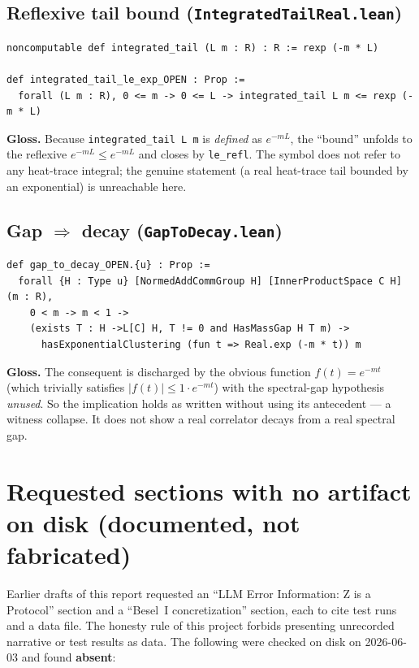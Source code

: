 \documentclass[11pt]{article}
\begin{document}
\subsection{Reflexive tail bound (\texttt{IntegratedTailReal.lean})}
\begin{Verbatim}[fontsize=\small,frame=single]
noncomputable def integrated_tail (L m : R) : R := rexp (-m * L)

def integrated_tail_le_exp_OPEN : Prop :=
  forall (L m : R), 0 <= m -> 0 <= L -> integrated_tail L m <= rexp (-m * L)
\end{Verbatim}
\textbf{Gloss.} Because \texttt{integrated\_tail L m} is \emph{defined} as
$e^{-mL}$, the ``bound'' unfolds to the reflexive $e^{-mL}\le e^{-mL}$ and
closes by \texttt{le\_refl}. The symbol does not refer to any heat-trace
integral; the genuine statement (a real heat-trace tail bounded by an
exponential) is unreachable here.

\subsection{Gap $\Rightarrow$ decay (\texttt{GapToDecay.lean})}
\begin{Verbatim}[fontsize=\small,frame=single]
def gap_to_decay_OPEN.{u} : Prop :=
  forall {H : Type u} [NormedAddCommGroup H] [InnerProductSpace C H] (m : R),
    0 < m -> m < 1 ->
    (exists T : H ->L[C] H, T != 0 and HasMassGap H T m) ->
      hasExponentialClustering (fun t => Real.exp (-m * t)) m
\end{Verbatim}
\textbf{Gloss.} The consequent is discharged by the obvious function
$f(t)=e^{-mt}$ (which trivially satisfies $|f(t)|\le 1\cdot e^{-mt}$) with the
spectral-gap hypothesis \emph{unused}. So the implication holds as written
without using its antecedent --- a witness collapse. It does not show a real
correlator decays from a real spectral gap.
\clearpage
\section{Requested sections with no artifact on disk (documented, not fabricated)}
\label{sec:absent}

Earlier drafts of this report requested an ``LLM Error Information: Z is a
Protocol'' section and a ``Besel~I concretization'' section, each to cite test
runs and a data file. The honesty rule of this project forbids presenting
unrecorded narrative or test results as data. The following were checked on
disk on 2026-06-03 and found \textbf{absent}:
\end{document}
